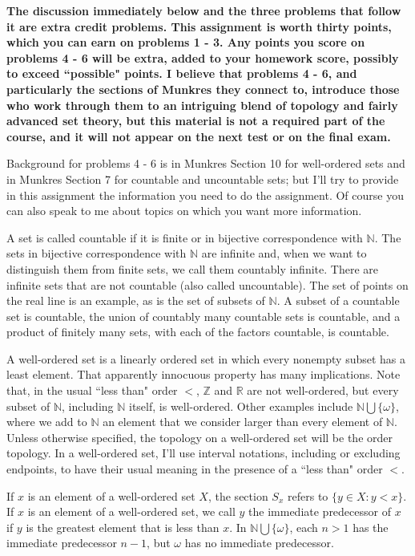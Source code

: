 \documentclass{amsart}
\theoremstyle{plain}
\theoremstyle{definition}
\theoremstyle{remark}
\begin{document}
\vspace{.25in} {\bf The discussion immediately below and the three problems that follow it are extra credit problems. This assignment is worth thirty points, which you can earn on problems 1 - 3. Any points you score on problems 4 - 6 will be extra, added to your homework score, possibly to exceed ``possible" points. I believe that problems 4 - 6, and particularly the sections of Munkres they connect to, introduce those who work through them to an intriguing blend of topology and fairly advanced set theory, but this material is not a required part of the course, and it will not appear on the next test or on the final exam.}
 

\vspace{.25in}
Background for problems 4 - 6 is in Munkres Section 10 for well-ordered sets and in Munkres Section 7 for countable and uncountable sets; but I'll try to provide in this assignment the information you need to do the assignment. Of course you can also speak to me about topics on which you want more information. 

A set is called countable if it is finite or in bijective correspondence with $\mathbb N$. The sets in bijective correspondence with $\mathbb N$ are infinite and, when we want to distinguish them from finite sets, we call them countably infinite. There are infinite sets that are not countable (also called uncountable). The set of points on the real line is an example, as is the set of subsets of $\mathbb N$. A subset of a countable set is countable, the union of countably many countable sets is countable, and a product of finitely many sets, with each of the factors countable, is countable. 

A well-ordered set is a linearly ordered set in which every nonempty subset has a least element. That apparently innocuous property has many implications. Note that, in the usual ``less than" order $<$, $\mathbb Z$ and $\mathbb R$ are not well-ordered, but every subset of $\mathbb N$, including $\mathbb N$ itself, is well-ordered. Other examples include $\mathbb N \bigcup \{ \omega\}$, where we add to $\mathbb N$ an element that we consider larger than every element of $\mathbb N$. Unless otherwise specified, the topology on a well-ordered set will be the order topology. In a well-ordered set, I'll use interval notations, including or excluding endpoints, to have their usual meaning in the presence of a ``less than" order $<$. 

If $x$ is an element of a well-ordered set $X$, the section $S_x$ refers to $\{ y \in X : y < x\}$.  If $x$ is an element of a well-ordered set, we call $y$ the immediate predecessor of $x$ if $y$ is the greatest element that is less than $x$. In $\mathbb N \bigcup \{ \omega\}$, each $n > 1$ has the immediate predecessor $n-1$, but $\omega$ has no immediate predecessor. 
\end{document}
